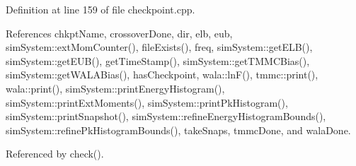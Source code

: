 Definition at line 159 of file checkpoint.\-cpp.



References chkpt\-Name, crossover\-Done, dir, elb, eub, sim\-System\-::ext\-Mom\-Counter(), file\-Exists(), freq, sim\-System\-::get\-E\-L\-B(), sim\-System\-::get\-E\-U\-B(), get\-Time\-Stamp(), sim\-System\-::get\-T\-M\-M\-C\-Bias(), sim\-System\-::get\-W\-A\-L\-A\-Bias(), has\-Checkpoint, wala\-::ln\-F(), tmmc\-::print(), wala\-::print(), sim\-System\-::print\-Energy\-Histogram(), sim\-System\-::print\-Ext\-Moments(), sim\-System\-::print\-Pk\-Histogram(), sim\-System\-::print\-Snapshot(), sim\-System\-::refine\-Energy\-Histogram\-Bounds(), sim\-System\-::refine\-Pk\-Histogram\-Bounds(), take\-Snaps, tmmc\-Done, and wala\-Done.



Referenced by check().


